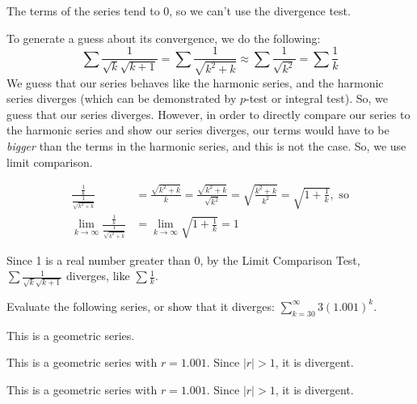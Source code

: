 \begin{solution}
The terms of the series tend to 0, so we can't use the divergence test.

To generate a guess about its convergence, we do the following:
\[\sum \frac{1}{\sqrt{k}\sqrt{k+1}}=\sum\frac{1}{\sqrt{k^2+k}} \approx \sum\frac{1}{\sqrt{k^2}}=\sum\frac{1}{k}\]We guess that our series behaves like the harmonic series, and the harmonic series diverges (which can be demonstrated by $p$-test or integral test). So, we guess that our series diverges. However, in order to directly compare our series to the harmonic series and show our series diverges, our terms would have to be \emph{bigger} than the terms in the harmonic series, and this is not the case. So, we use limit comparison.

\begin{align*}
\frac{\frac{1}{k}}{\frac{1}{\sqrt{k^2+k}}}&=\frac{\sqrt{k^2+k}}{k}=\frac{\sqrt{k^2+k}}{\sqrt{k^2}}=
\sqrt{\frac{k^2+k}{k^2}}=\sqrt{1+\frac{1}{k}},\mbox{ so}\\
\lim_{k \rightarrow \infty}\frac{\frac{1}{k}}{\frac{1}{\sqrt{k^2+k}}}&=\lim_{k \rightarrow \infty}\sqrt{1+\frac{1}{k}}=1
\end{align*}

Since 1 is a real number greater than 0, by the Limit Comparison Test, $\sum \frac{1}{\sqrt{k}\sqrt{k+1}}$  diverges, like $\sum \frac{1}{k}$.
\end{solution}












\begin{question}
Evaluate the following series, or show that it diverges:
$\displaystyle\sum_{k=30}^\infty 3(1.001)^k$.
\end{question}

\begin{hint}
This is a geometric series.
\end{hint}

\begin{answer}
This is a geometric series with $r=1.001$. Since $|r|>1$, it is divergent.
\end{answer}

\begin{solution}
This is a geometric series with $r=1.001$. Since $|r|>1$, it is divergent.
\end{solution}








